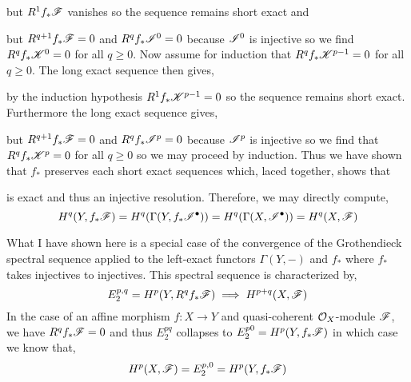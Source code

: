 \documentclass[12pt]{article}
\begin{document}
but $R^1 f_* \mathscr{F}$ vanishes so the sequence remains short exact and 
\begin{center}
\end{center}
but $R^{q+1} f_* \mathscr{F} = 0$ and $R^q f_* \mathscr{I}^0 = 0$ because $\mathscr{I}^0$ is injective so we find $R^q f_* \mathscr{K}^0 = 0$ for all $q \ge 0$. Now assume for induction that $R^q f_* \mathscr{K}^{p - 1} = 0$ for all $q \ge 0$. The long exact sequence then gives,
\begin{center}
\end{center}
by the induction hypothesis $R^1 f_* \mathscr{K}^{p - 1} = 0$ so the sequence remains short exact. Furthermore the long exact sequence gives,
\begin{center}
\end{center}
but $R^{q+1} f_* \mathscr{F} = 0$ and $R^q f_* \mathscr{I}^p = 0$ because $\mathscr{I}^p$ is injective so we find that $R^q f_* \mathscr{K}^p = 0$ for all $q \ge 0$ so we may proceed by induction. Thus we have shown that $f_*$ preserves each short exact sequences which, laced together, shows that
\begin{center}
\end{center}
is exact and thus an injective resolution. Therefore, we may directly compute,
\[ H^q(Y, f_* \mathscr{F}) = H^q(\Gamma(Y, f_* \mathscr{I}^\bullet)) = H^q(\Gamma(X, \mathscr{I}^\bullet)) = H^q(X, \mathscr{F}) \]

\begin{remark}
What I have shown here is a special case of the convergence of the Grothendieck spectral sequence applied to the left-exact functors $\Gamma(Y, -)$ and $f_*$ where $f_*$ takes injectives to injectives. This spectral sequence is characterized by,
\[ E^{p, q}_2 = H^p(Y, R^q f_* \mathscr{F}) \implies H^{p+q}(X, \mathscr{F}) \] 
In the case of an affine morphism $f : X \to Y$ and quasi-coherent $\mathcal{O}_{X}$-module $\mathscr{F}$, we have $R^q f_* \mathscr{F} = 0$ and thus $E^{pq}_2$ collapses to $E_2^{p0} = H^p(Y, f_* \mathscr{F})$ in which case we know that,
\[ H^p(X, \mathscr{F}) = E^{p, 0}_2 = H^p(Y, f_* \mathscr{F}) \]
\end{remark}
\end{document}
